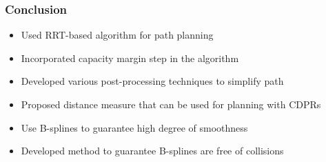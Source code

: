 \begin{frame}
	\frametitle{Conclusion}

	\begin{itemize}
		
		\item

			Used RRT-based algorithm for path planning

		\item

			Incorporated capacity margin step in the algorithm

		\item

			Developed various post-processing techniques to simplify path

		\item

			Proposed distance measure that can be used for planning with CDPRs

		\item

			Use B-splines to guarantee high degree of smoothness

		\item

			Developed method to guarantee B-splines are free of collisions

	\end{itemize}
\end{frame}
